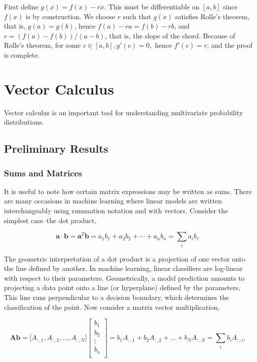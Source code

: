 \documentclass[11pt]{amsart}
\begin{document}
First define $g(x) = f(x) - rx$. This must be differentiable on $[a, b]$ since $f(x)$ is by construction. We choose $r$ such that $g(x)$ satisfies Rolle's theorem, that is, $g(a) = g(b)$, hence $f(a) - ra = f(b) - rb$, and $r = (f(a) - f(b))/(a - b)$, that is, the slope of the chord. Because of Rolle's theorem, for some $c \in [a, b], g'(c) = 0,$ hence $f'(c) = r$, and the proof is complete.

\section{Vector Calculus}

Vector calculus is an important tool for understanding multivariate probability distributions.

\subsection{Preliminary Results}

\subsubsection{Sums and Matrices}

It is useful to note how certain matrix expressions may be written as sums. There are many occasions in machine learning where linear models are written interchangeably using summation notation and with vectors. Consider the simplest case--the dot product,

$$\mathbf{a}\cdot\mathbf{b} = \mathbf{a}^T\mathbf{b} = a_1b_1 + a_2b_2 + \cdots + a_nb_n = \sum_i a_ib_i.$$

The geometric interpretation of a dot product is a projection of one vector onto the line defined by another. In machine learning, linear classifiers are log-linear with respect to their parameters. Geometrically, a model prediction amounts to projecting a data point onto a line (or hyperplane) defined by the parameters. This line runs perpendicular to a decision boundary, which determines the classification of the point. Now consider a matrix vector multiplication,

$$\mathbf{A}\mathbf{b} = \big[A_{:, 1}, A_{:, 2}, \dots, A_{:, N}\big]
\begin{bmatrix}
b_1 \\
b_2 \\
\vdots \\
b_n \\
\end{bmatrix}
= b_1A_{:, 1} + b_2A_{:, 2} + \dots + b_NA_{:, N} = \sum_{i} b_iA_{:, i},$$
\end{document}
